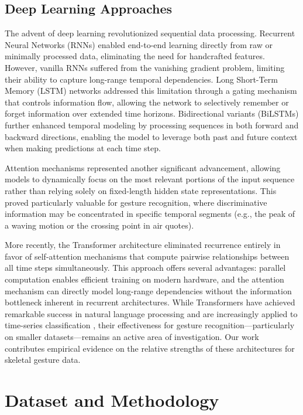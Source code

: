 \documentclass[conference]{IEEEtran}
\begin{document}
\subsection{Deep Learning Approaches}
The advent of deep learning revolutionized sequential data processing. Recurrent Neural Networks (RNNs) enabled end-to-end learning directly from raw or minimally processed data, eliminating the need for handcrafted features. However, vanilla RNNs suffered from the vanishing gradient problem, limiting their ability to capture long-range temporal dependencies. Long Short-Term Memory (LSTM) networks \cite{hochreiter1997} addressed this limitation through a gating mechanism that controls information flow, allowing the network to selectively remember or forget information over extended time horizons. Bidirectional variants (BiLSTMs) further enhanced temporal modeling by processing sequences in both forward and backward directions, enabling the model to leverage both past and future context when making predictions at each time step.

Attention mechanisms \cite{bahdanau2014} represented another significant advancement, allowing models to dynamically focus on the most relevant portions of the input sequence rather than relying solely on fixed-length hidden state representations. This proved particularly valuable for gesture recognition, where discriminative information may be concentrated in specific temporal segments (e.g., the peak of a waving motion or the crossing point in air quotes).

More recently, the Transformer architecture \cite{vaswani2017} eliminated recurrence entirely in favor of self-attention mechanisms that compute pairwise relationships between all time steps simultaneously. This approach offers several advantages: parallel computation enables efficient training on modern hardware, and the attention mechanism can directly model long-range dependencies without the information bottleneck inherent in recurrent architectures. While Transformers have achieved remarkable success in natural language processing and are increasingly applied to time-series classification \cite{zerveas2021}, their effectiveness for gesture recognition---particularly on smaller datasets---remains an active area of investigation. Our work contributes empirical evidence on the relative strengths of these architectures for skeletal gesture data.

\section{Dataset and Methodology}
\end{document}
